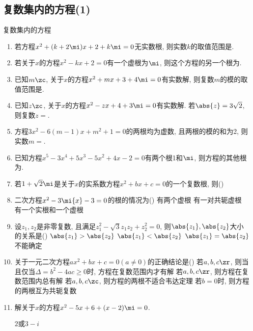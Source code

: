 \subsection{复数集内的方程(1)}
\zsd 复数集内的方程 \\
\begin{enumerate}
\item 若方程$x^2+(k+2\mi)x+2+k\mi=0$无实数根, 则实数$k$的取值范围是. 


\item 若关于$x$的方程$x^2-kx+2=0$有一个虚根为$\mi$, 则这个方程的另一个根为\blkda{$-2\mi$}. 


\item 已知$m\zc$, 关于$x$的方程$x^2+mx+3+4\mi=0$有实数解, 则复数$m$的模的取值范围是\blkda{$[4,+\infty)$}. 


\item 已知$z\zc$, 关于$x$的方程$x^2-zx+4+3\mi=0$有实数解. 若$\abs{z}=3\sqrt{2}$, 则复数$z=$. 

\item 方程$3x^2-6(m-1)x+m^2+1=0$的两根均为虚数, 且两根的模的和为2, 则实数$m=$. 


\item 已知方程$x^5-3x^4+5x^3-5x^2+4x-2=0$有两个根1和$\mi$, 则方程的其他根为\blkda{$1\pm\mi,-\mi$}. 


\item 若$1+\sqrt{2}\mi$是关于$x$的实系数方程$x^2+bx+c=0$的一个复数根, 则\dotfill()

\item 二次方程$x^2-3\mi{x}-3=0$的根的情况为\dotfill()
{有两个虚根}
{有一对共轭虚根}
{有一个实根和一个虚根}

\item 设$z_1,z_2$是非零复数, 且满足$z_1^2-\sqrt{3}z_1z_2+z_2^2=0$, 则$\abs{z_1},\abs{z_2}$大小的关系是\dotfill()
\xx
{$\abs{z_1}>\abs{z_2}$}
{$\abs{z_1}<\abs{z_2}$}
{$\abs{z_1}=\abs{z_2}$}
{不能确定}


\item 关于一元二次方程$ax^2+bx+c=0(a\neq 0)$的正确结论是\dotfill() 
\xx
{若$a,b,c\zr$, 则当且仅当$\Delta=b^2-4ac\geq0$时, 方程在复数范围内才有解}
{若$a,b,c\zr$, 则方程在复数范围内总有解}
{若$a,b,c\zc$, 则方程的两根不适合韦达定理}
{若$b=0$时, 则方程的两根互为共轭复数}



\item 解关于$x$的方程$x^2-5x+6+(x-2)\mi=0$. 
\begin{jieda}
    $2$或$3-i$
\end{jieda}



\end{enumerate}
